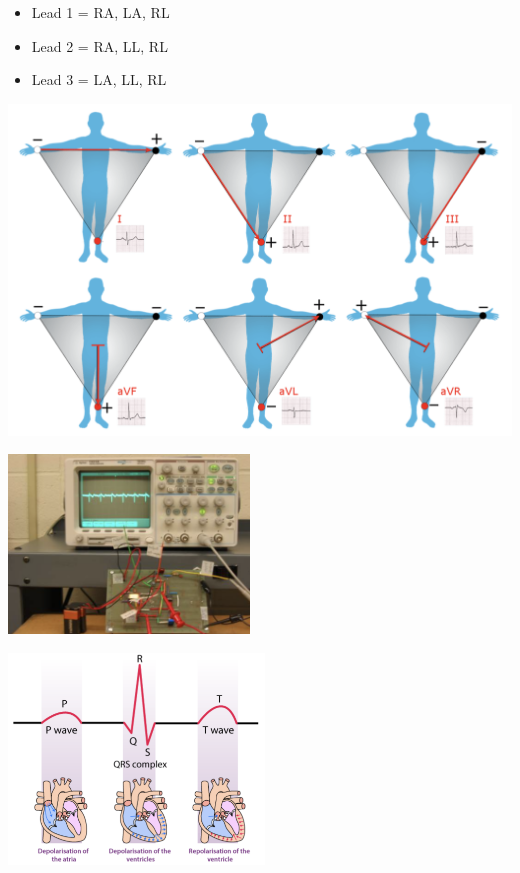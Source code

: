 \documentclass[
  11pt,
  letterpaper,
  DIV=11,
  numbers=noendperiod]{scrreprt}
\begin{document}
\begin{itemize}
\item
  Lead 1 = RA, LA, RL
\item
  Lead 2 = RA, LL, RL
\item
  Lead 3 = LA, LL, RL
\end{itemize}

\begin{center}
\includegraphics[width=5.82292in,height=\textheight]{images/clipboard-2797361598.png}
\end{center}

\begin{center}
\includegraphics[width=0.48\textwidth,height=\textheight]{images/clipboard-91339677.png}
\end{center}

\begin{center}
\includegraphics[width=0.51\textwidth,height=\textheight]{images/clipboard-1351516102.png}
\end{center}
\end{document}
